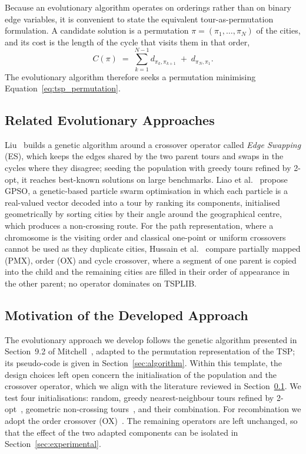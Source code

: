 \documentclass[11pt,a4paper]{article}
\begin{document}
Because an evolutionary algorithm operates on orderings rather than on binary
edge variables, it is convenient to state the equivalent tour-as-permutation
formulation. A candidate solution is a permutation
$\pi=(\pi_1,\dots,\pi_N)$ of the cities, and its cost is the length of the
cycle that visits them in that order,
\begin{equation}
  C(\pi) \;=\; \sum_{k=1}^{N-1} d_{\pi_k,\pi_{k+1}} \;+\; d_{\pi_N,\pi_1}.
  \label{eq:tsp_permutation}
\end{equation}
The evolutionary algorithm therefore seeks a permutation minimising
Equation~\eqref{eq:tsp_permutation}.

\subsection{Related Evolutionary Approaches}
\label{sec:related}

Liu~\cite{liu2014} builds a genetic algorithm around a crossover operator
called \emph{Edge Swapping} (ES), which keeps the edges shared by the two
parent tours and swaps in the cycles where they disagree; seeding the
population with greedy tours refined by 2-opt, it reaches best-known solutions
on large benchmarks. Liao et al.~\cite{liao2012} propose GPSO, a genetic-based
particle swarm optimisation in which each particle is a real-valued vector
decoded into a tour by ranking its components, initialised geometrically by
sorting cities by their angle around the geographical centre, which produces a
non-crossing route. For the path representation, where a chromosome is the
visiting order and classical one-point or uniform crossovers cannot be used as
they duplicate cities, Hussain et al.~\cite{hussain2017} compare partially
mapped (PMX), order (OX) and cycle crossover, where a segment of one parent is
copied into the child and the remaining cities are filled in their order of
appearance in the other parent; no operator dominates on TSPLIB.

\subsection{Motivation of the Developed Approach}

The evolutionary approach we develop follows the genetic algorithm presented in
Section~9.2 of Mitchell~\cite{mitchell1997}, adapted to the permutation
representation of the TSP; its pseudo-code is given in
Section~\ref{sec:algorithm}. Within this template, the design choices left open
concern the initialisation of the population and the crossover operator, which
we align with the literature reviewed in Section~\ref{sec:related}. We
test four initialisations: random, greedy nearest-neighbour tours refined by
2-opt~\cite{liu2014}, geometric non-crossing tours~\cite{liao2012}, and their
combination. For recombination we adopt the order
crossover (OX)~\cite{hussain2017}. The remaining operators are left
unchanged, so that the effect of the two adapted components can be isolated in
Section~\ref{sec:experimental}.
\end{document}
